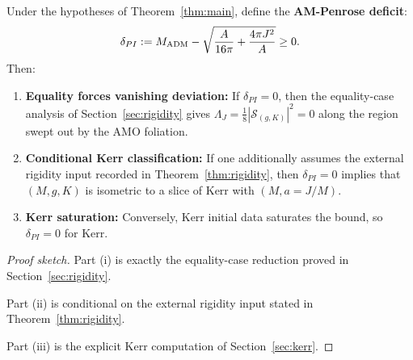 \begin{corollary}\label{cor:deficit}
Under the hypotheses of Theorem~\ref{thm:main}, define the \textbf{AM-Penrose deficit}:
\[
\delta_{PI} := M_{\mathrm{ADM}} - \sqrt{\frac{A}{16\pi} + \frac{4\pi J^2}{A}} \geq 0.
\]
Then:
\begin{enumerate}[label=\textup{(\roman*)}]
    \item \textbf{Equality forces vanishing deviation:} If $\delta_{PI} = 0$, then the equality-case analysis of Section~\ref{sec:rigidity} gives $\Lambda_J = \frac18 |\mathcal{S}_{(g,K)}|^2 = 0$ along the region swept out by the AMO foliation.
    \item \textbf{Conditional Kerr classification:} If one additionally assumes the external rigidity input recorded in Theorem~\ref{thm:rigidity}, then $\delta_{PI} = 0$ implies that $(M, g, K)$ is isometric to a slice of Kerr with $(M, a = J/M)$.
    \item \textbf{Kerr saturation:} Conversely, Kerr initial data saturates the bound, so $\delta_{PI}=0$ for Kerr.
\end{enumerate}
\end{corollary}

\begin{proof}[Proof sketch]
Part (i) is exactly the equality-case reduction proved in Section~\ref{sec:rigidity}.

Part (ii) is conditional on the external rigidity input stated in Theorem~\ref{thm:rigidity}.

Part (iii) is the explicit Kerr computation of Section~\ref{sec:kerr}.
\end{proof}

